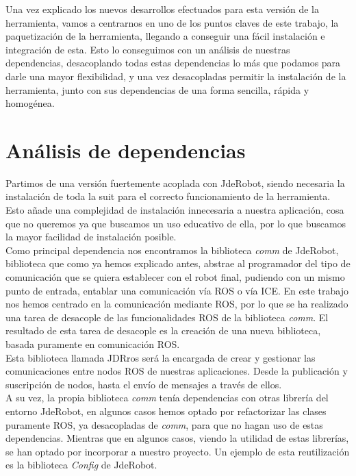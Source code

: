 Una vez explicado los nuevos desarrollos efectuados para esta versión de la herramienta, vamos a centrarnos en uno de los puntos claves de este trabajo, la paquetización de la herramienta, llegando a conseguir una fácil instalación e integración de esta. Esto lo conseguimos con un análisis de nuestras dependencias, desacoplando todas estas dependencias lo más que podamos para darle una mayor flexibilidad, y una vez desacopladas permitir la instalación de la herramienta, junto con sus dependencias de una forma sencilla, rápida y homogénea.

\section{Análisis de dependencias}
\label{sec:dependencias}
Partimos de una versión fuertemente acoplada con JdeRobot, siendo necesaria la instalación de toda la suit para el correcto funcionamiento de la herramienta. Esto añade una complejidad de instalación innecesaria a nuestra aplicación, cosa que no queremos ya que buscamos un uso educativo de ella, por lo que buscamos la mayor facilidad de instalación posible.\\

Como principal dependencia nos encontramos la biblioteca \textit{comm} de JdeRobot, biblioteca que como ya hemos explicado antes, abstrae al programador del tipo de comunicación que se quiera establecer con el robot final, pudiendo con un mismo punto de entrada, entablar una comunicación vía ROS o vía ICE. En este trabajo nos hemos centrado en la comunicación mediante ROS, por lo que se ha realizado una tarea de desacople de las funcionalidades ROS de la biblioteca \textit{comm}. El resultado de esta tarea de desacople es la creación de una nueva biblioteca, basada puramente en comunicación ROS.\\

Esta biblioteca llamada JDRros será la encargada de crear y gestionar las comunicaciones entre nodos ROS de nuestras aplicaciones. Desde la publicación y suscripción de nodos, hasta el envío de mensajes a través de ellos.\\

A su vez, la propia biblioteca \textit{comm} tenía dependencias con otras librería del entorno JdeRobot, en algunos casos hemos optado por refactorizar las clases puramente ROS, ya desacopladas de \textit{comm}, para que no hagan uso de estas dependencias. Mientras que en algunos casos, viendo la utilidad de estas librerías, se han optado por incorporar a nuestro proyecto. Un ejemplo de esta reutilización es la biblioteca \textit{Config} de JdeRobot.\\

